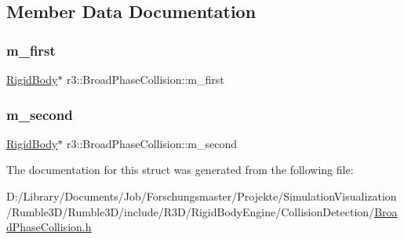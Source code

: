 \subsection{Member Data Documentation}
\mbox{\label{structr3_1_1_broad_phase_collision_a0fdb5a3015199eaf3a21ad9434078362}} 
\subsubsection{\texorpdfstring{m\+\_\+first}{m\_first}}
{\footnotesize\ttfamily \mbox{\hyperlink{classr3_1_1_rigid_body}{Rigid\+Body}}$\ast$ r3\+::\+Broad\+Phase\+Collision\+::m\+\_\+first}

\mbox{\label{structr3_1_1_broad_phase_collision_a08dcc5e2d352b0cf6fbe679804700731}} 
\subsubsection{\texorpdfstring{m\+\_\+second}{m\_second}}
{\footnotesize\ttfamily \mbox{\hyperlink{classr3_1_1_rigid_body}{Rigid\+Body}}$\ast$ r3\+::\+Broad\+Phase\+Collision\+::m\+\_\+second}



The documentation for this struct was generated from the following file\+:\begin{DoxyCompactItemize}
\item 
D\+:/\+Library/\+Documents/\+Job/\+Forschungsmaster/\+Projekte/\+Simulation\+Visualization/\+Rumble3\+D/\+Rumble3\+D/include/\+R3\+D/\+Rigid\+Body\+Engine/\+Collision\+Detection/\mbox{\hyperlink{_broad_phase_collision_8h}{Broad\+Phase\+Collision.\+h}}\end{DoxyCompactItemize}
